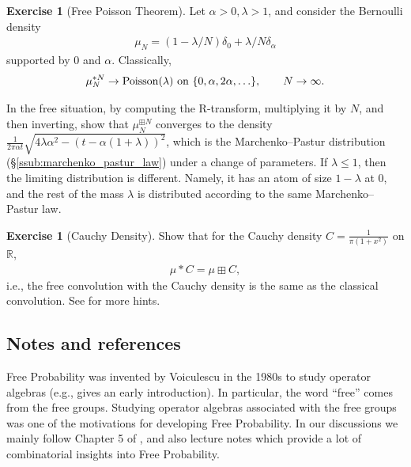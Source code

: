 \documentclass[letterpaper,11pt,oneside,reqno]{amsart}
\numberwithin{equation}{section}
\newcounter{lecture}
\theoremstyle{definition}
\newtheorem{exercise}[proposition]{Exercise}
\begin{document}
\begin{exercise}[Free Poisson Theorem]
Let $\alpha>0, \lambda>1$, and consider the Bernoulli density
\begin{align*}
    \mu_N=(1-\lambda/N)\delta_0+\lambda/N\delta_\alpha
\end{align*}
supported by $0$ and $\alpha$.
Classically, 
\begin{equation*}
    \mu_N^{*N}\to \mathrm{Poisson}(\lambda)
    \textnormal{\ on $\{0,\alpha,2 \alpha,\ldots\}$}
    ,\qquad N\to\infty.
\end{equation*}

In the free situation, by computing the R-transform, multiplying it by $N$, 
and then inverting, show that $\mu_N^{\boxplus N}$ 
converges to the density $\frac{1}{2\pi\alpha t}\sqrt{4\lambda\alpha^2-(t-\alpha(1+\lambda))^2}$, 
which is the Marchenko--Pastur distribution (\S \ref{ssub:marchenko_pastur_law})
under a change of parameters. 
If $\lambda\le1$, then the limiting distribution is different. Namely, it has an atom of size $1- \lambda$ at $0$,
and the rest of the mass $\lambda$ is distributed according to the same Marchenko--Pastur law.
\end{exercise}

\begin{exercise}[{Cauchy Density}]
Show that for the Cauchy density $C=\frac{1}{\pi(1+x^2)}$ on $\mathbb{R}$, 
\begin{align*}
    \mu*C=\mu\boxplus C,
\end{align*}
i.e., the free convolution with the Cauchy density is the same as the classical convolution.
See \cite[Exercise 5.3.41]{AndersonGuionnetZeitouniBook} for more hints.
\end{exercise}


\subsection{Notes and references} %
\label{sub:notes_Free}

Free Probability was invented by Voiculescu in the 1980s
to study operator algebras
(e.g., \cite{Voiculescu_Free_book} gives an early introduction).
In particular, the word ``free'' comes from the free groups.
Studying operator algebras associated with the free groups 
was one of the motivations for developing Free Probability.
In our discussions we mainly follow Chapter 5 of \cite{AndersonGuionnetZeitouniBook},
and also lecture notes \cite{Novak2012FreeLectures} which provide a lot of combinatorial
insights into Free Probability.
\end{document}
